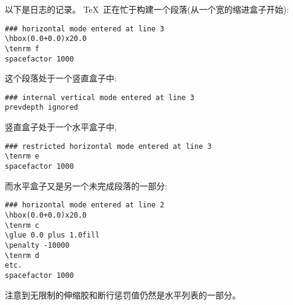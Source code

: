 \documentclass{book}
\begin{document}
以下是日志的记录。
\TeX\ 正在忙于构建一个段落(从一个\n{20pt}宽的缩进盒子开始):
\begin{verbatim}
### horizontal mode entered at line 3
\hbox(0.0+0.0)x20.0
\tenrm f
spacefactor 1000
\end{verbatim}
这个段落处于一个竖直盒子中:
\begin{verbatim}
### internal vertical mode entered at line 3
prevdepth ignored
\end{verbatim}
竖直盒子处于一个水平盒子中, 
\begin{verbatim}
### restricted horizontal mode entered at line 3
\tenrm e
spacefactor 1000
\end{verbatim}
而水平盒子又是另一个未完成段落的一部分:
\begin{verbatim}
### horizontal mode entered at line 2
\hbox(0.0+0.0)x20.0
\tenrm c
\glue 0.0 plus 1.0fill
\penalty -10000
\tenrm d
etc.
spacefactor 1000
\end{verbatim}
注意到无限制的伸缩胶和断行惩罚值仍然是水平列表的一部分。
\end{document}
